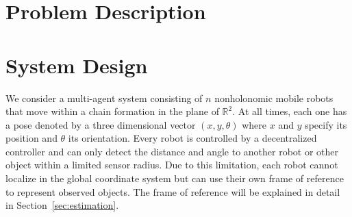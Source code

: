 \documentclass[letterpaper, 10 pt, conference]{ieeeconf}  %
\begin{document}
	
	\section{Problem Description} 
	\label{sec:problemdesc} 
	
	
	\section{System Design}
	\label{sec:sysdesign}
	
	We consider a multi-agent system consisting of $n$ nonholonomic mobile
	robots that move within a chain formation in the plane of
	$\mathbb{R}^2$. At all times, each one has a pose denoted by a three
	dimensional vector $(x, y, \theta)$ where $x$ and $y$ specify its
	position and $\theta$ its orientation. Every robot is controlled by a
	decentralized controller and can only detect the distance and angle to
	another robot or other object within a limited sensor radius. Due to
	this limitation, each robot cannot localize in the global coordinate
	system but can use their own frame of reference to represent observed
	objects. The frame of reference will be explained in detail in
	Section~\ref{sec:estimation}.
	
\end{document}
